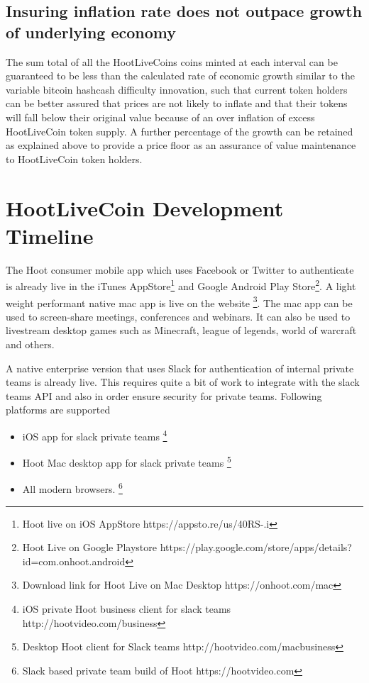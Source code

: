 \documentclass{article}
\begin{document}

\subsection{Insuring inflation rate does not outpace growth of underlying economy}
The sum total of all the HootLiveCoins coins minted at each interval can be guaranteed to be less than the calculated rate of economic growth similar to the variable bitcoin hashcash difficulty innovation, such that current token holders can be better assured that prices are not likely to inflate and that their tokens will fall below their original value because of an over inflation of excess HootLiveCoin token supply.
A further percentage of the growth can be retained as explained above to provide a price floor as an assurance of value maintenance to HootLiveCoin token holders. 


\section{HootLiveCoin Development Timeline}
The Hoot consumer mobile app which uses Facebook or Twitter to authenticate is already live in the iTunes AppStore\footnote{Hoot live on iOS AppStore https://appsto.re/us/40RS-.i} and Google Android Play Store\footnote{Hoot Live on Google Playstore https://play.google.com/store/apps/details?id=com.onhoot.android}.
A light weight performant native mac app is live on
the website \footnote{Download link for Hoot Live on Mac Desktop https://onhoot.com/mac}. The mac app can be used to screen-share meetings, conferences and webinars. It can also be used
to livestream desktop games such as Minecraft, league of legends,
world of warcraft and others.

A native enterprise version that uses Slack for authentication of
internal private teams is already live.
 This requires quite a bit of work to integrate with the slack teams API and also in order ensure security for private teams. Following platforms are supported
\begin{itemize}

\item iOS app for slack private teams \footnote{ iOS private Hoot business client for slack teams http://hootvideo.com/business}
\item Hoot Mac desktop app for slack private teams \footnote{Desktop Hoot client for Slack teams http://hootvideo.com/macbusiness}
\item All modern browsers. \footnote{Slack based private team build of Hoot https://hootvideo.com}
\end{itemize}
\end{document}
